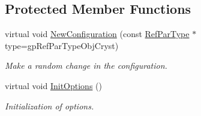 \subsection*{Protected Member Functions}
\begin{DoxyCompactItemize}
\item 
\mbox{\label{class_obj_cryst_1_1_monte_carlo_obj_a6bf556666f593138f1320706b2c6933b}} 
virtual void \mbox{\hyperlink{class_obj_cryst_1_1_monte_carlo_obj_a6bf556666f593138f1320706b2c6933b}{New\+Configuration}} (const \mbox{\hyperlink{class_obj_cryst_1_1_ref_par_type}{Ref\+Par\+Type}} $\ast$type=gp\+Ref\+Par\+Type\+Obj\+Cryst)
\begin{DoxyCompactList}\small\item\em Make a random change in the configuration. \end{DoxyCompactList}\item 
\mbox{\label{class_obj_cryst_1_1_monte_carlo_obj_a450204f6b700c18f7a596a7412a4166e}} 
virtual void \mbox{\hyperlink{class_obj_cryst_1_1_monte_carlo_obj_a450204f6b700c18f7a596a7412a4166e}{Init\+Options}} ()
\begin{DoxyCompactList}\small\item\em Initialization of options. \end{DoxyCompactList}\end{DoxyCompactItemize}
